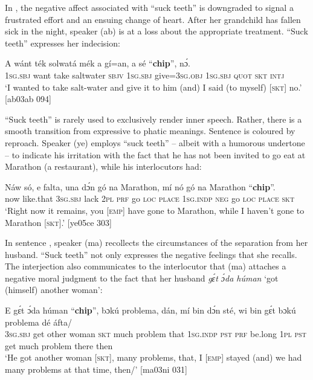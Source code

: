 In , the negative affect associated with “suck teeth” is downgraded to signal a frustrated effort and an ensuing change of heart. After her grandchild has fallen sick in the night, speaker (ab) is at a loss about the appropriate treatment. “Suck teeth” expresses her indecision: 


\ea%
    \label{ex:key:1664}
    \gll A    wánt  ték    solwatá    mék    a    gí=an,
a    sé    “\textbf{chip}”,  nɔ́.\\
\textsc{1sg.sbj}  want  take    saltwater  \textsc{sbjv}    \textsc{1sg.sbj}  give=\textsc{3sg.obj}
\textsc{1sg.sbj}  \textsc{quot}    \textsc{skt}    \textsc{intj}\\

\glt ‘I wanted to take salt-water and give it to him (and) I said (to myself) 
\textsc{[skt]} no.’ [ab03ab 094]
\z

“Suck teeth” is rarely used to exclusively render inner speech. Rather, there is a smooth transition from expressive to phatic meanings. Sentence  is coloured by reproach. Speaker (ye) employs “suck teeth” – albeit with a humorous undertone – to indicate his irritation with the fact that he has not been invited to go eat at Marathon (a restaurant), while his interlocutors had:


\ea%
    \label{ex:key:1665}
    \gll Náw    só,    e    falta,  una  dɔ́n  gó  na  Marathon,
mí    nó  gó  na  Marathon  “\textbf{chip}”.\\
now    like.that  \textsc{3sg.sbj}  lack    \textsc{2pl}  \textsc{prf}  go  \textsc{loc}  \textsc{place}
\textsc{1sg.indp}  \textsc{neg}  go  \textsc{loc}  \textsc{place}    \phantom{‘}\textsc{skt}\\

\glt ‘Right now it remains, you [\textsc{emp}] have gone to Marathon, while 
I haven’t gone to Marathon \textsc{[skt]}.’ [ye05ce 303]
\z

In sentence , speaker (ma) recollects the circumstances of the separation from her husband. “Suck teeth” not only expresses the negative feelings that she recalls. The interjection also communicates to the interlocutor that (ma) attaches a negative moral judgment to the fact that her husband \textit{gɛ́t ɔ́da húman} ‘got (himself) another woman’:


\ea%
    \label{ex:key:1666}
    \gll E    gɛ́t  ɔ́da    húman    “\textbf{chip}”,  bɔkú  problema,
dán,    mí    bin  dɔ́n  sté,    wi  bin  gɛ́t  bɔkú  
problema  dé    áfta/\\
\textsc{3sg.sbj}  get  other  woman  \phantom{‘}\textsc{skt}    much  problem
that    \textsc{1sg.indp}  \textsc{pst}  \textsc{prf}  be.long  \textsc{1pl}  \textsc{pst}  get  much
problem    there  then\\
\glt ‘He got another woman \textsc{[skt]}, many problems, that, I [\textsc{emp}] stayed 
(and) we had many problems at that time, then/’ [ma03ni 031]
\z

